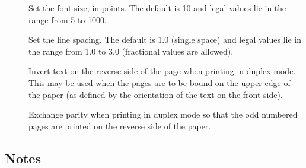 \begin{description}
\item[\code{\#}]
   Set the font size, in points.  The default is 10 and legal values lie in
   the range from 5 to 1000.

\item[\code{\#}]
   Set the line spacing.  The default is 1.0 (single space) and legal values
   lie in the range from 1.0 to 3.0 (fractional values are allowed).

\item[]
   Invert text on the reverse side of the page when printing in duplex mode.
   This may be used when the pages are to be bound on the upper edge of the
   paper (as defined by the orientation of the text on the front side).

\item[]
   Exchange parity when printing in duplex mode so that the odd numbered pages
   are printed on the reverse side of the paper.

\end{description}

\subsection*{Notes}


